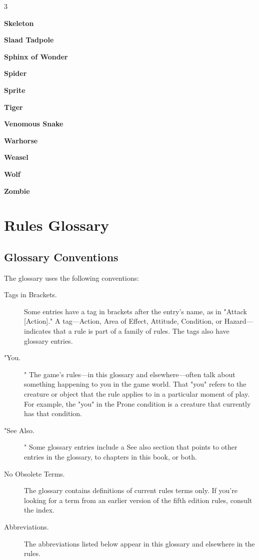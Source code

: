 \documentclass[10pt,a4paper,twoside,bg=print,twocolumn,openany,nodeprecatedcode]{dndbook}
\begin{document}
\begin{itemize}
\begin{multicols}{3}
\item \textbf{Skeleton}
\item \textbf{Slaad Tadpole}
\item \textbf{Sphinx of Wonder}
\item \textbf{Spider}
\item \textbf{Sprite}
\item \textbf{Tiger}
\item \textbf{Venomous Snake}
\item \textbf{Warhorse}
\item \textbf{Weasel}
\item \textbf{Wolf}
\item \textbf{Zombie}
\end{multicols}

\end{itemize}

\chapter{Rules Glossary}
\section{Glossary Conventions}
The glossary uses the following conventions:


\begin{description}
\item[Tags in Brackets.]
Some entries have a tag in brackets after the entry's name, as in "Attack [Action]." A tag—Action, Area of Effect, Attitude, Condition, or Hazard—indicates that a rule is part of a family of rules. The tags also have glossary entries.
\item["You.]
" The game's rules—in this glossary and elsewhere—often talk about something happening to you in the game world. That "you" refers to the creature or object that the rule applies to in a particular moment of play. For example, the "you" in the Prone condition is a creature that currently has that condition.
\item["See Also.]
" Some glossary entries include a See also section that points to other entries in the glossary, to chapters in this book, or both.
\item[No Obsolete Terms.]
The glossary contains definitions of current rules terms only. If you're looking for a term from an earlier version of the fifth edition rules, consult the index.
\item[Abbreviations.]
The abbreviations listed below appear in this glossary and elsewhere in the rules.
\end{description}
\end{document}
